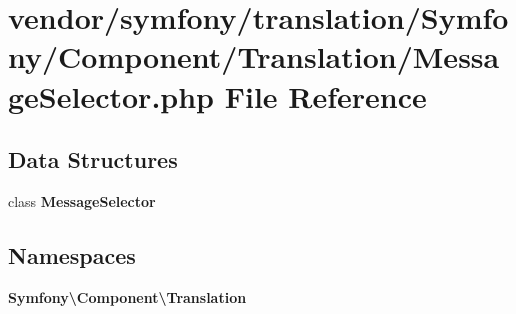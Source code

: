 \section{vendor/symfony/translation/\+Symfony/\+Component/\+Translation/\+Message\+Selector.php File Reference}
\label{_message_selector_8php}
\subsection*{Data Structures}
\begin{DoxyCompactItemize}
\item 
class {\bf Message\+Selector}
\end{DoxyCompactItemize}
\subsection*{Namespaces}
\begin{DoxyCompactItemize}
\item 
 {\bf Symfony\textbackslash{}\+Component\textbackslash{}\+Translation}
\end{DoxyCompactItemize}
